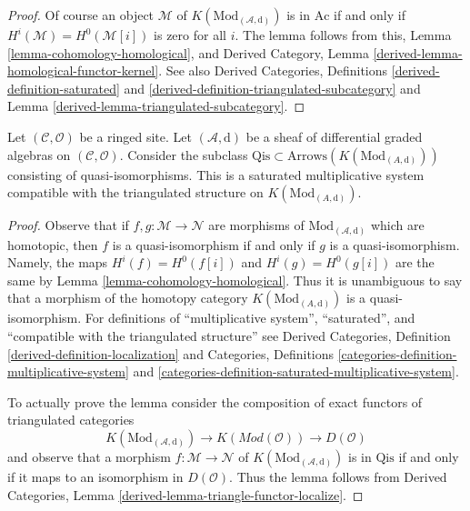 \begin{proof}
Of course an object $\mathcal{M}$ of $K(\text{Mod}_{(\mathcal{A}, \text{d})})$
is in $\text{Ac}$ if and only if $H^i(\mathcal{M}) = H^0(\mathcal{M}[i])$
is zero for all $i$. The lemma follows from this,
Lemma \ref{lemma-cohomology-homological}, and
Derived Category, Lemma \ref{derived-lemma-homological-functor-kernel}.
See also Derived Categories, Definitions \ref{derived-definition-saturated}
and \ref{derived-definition-triangulated-subcategory} and
Lemma \ref{derived-lemma-triangulated-subcategory}.
\end{proof}

\begin{lemma}
\label{lemma-qis}
Let $(\mathcal{C}, \mathcal{O})$ be a ringed site. Let
$(\mathcal{A}, \text{d})$ be a sheaf of differential graded algebras
on $(\mathcal{C}, \mathcal{O})$.
Consider the subclass
$\text{Qis} \subset \text{Arrows}(K(\text{Mod}_{(A, \text{d})}))$
consisting of quasi-isomorphisms. This is a saturated multiplicative
system compatible with the triangulated structure on
$K(\text{Mod}_{(A, \text{d})})$.
\end{lemma}

\begin{proof}
Observe that if $f , g : \mathcal{M} \to \mathcal{N}$ are morphisms
of $\text{Mod}_{(\mathcal{A}, \text{d})}$ which are homotopic,
then $f$ is a quasi-isomorphism if and only if $g$ is a quasi-isomorphism.
Namely, the maps $H^i(f) = H^0(f[i])$ and $H^i(g) = H^0(g[i])$ are
the same by Lemma \ref{lemma-cohomology-homological}. Thus it is
unambiguous to say that a morphism of the homotopy category
$K(\text{Mod}_{(A, \text{d})})$ is a quasi-isomorphism.
For definitions of ``multiplicative system'', ``saturated'', and
``compatible with the triangulated structure'' see
Derived Categories, Definition \ref{derived-definition-localization}
and
Categories, Definitions \ref{categories-definition-multiplicative-system}
and \ref{categories-definition-saturated-multiplicative-system}.

\medskip\noindent
To actually prove the lemma consider the composition
of exact functors of triangulated categories
$$
K(\text{Mod}_{(\mathcal{A}, \text{d})})
\longrightarrow
K(\textit{Mod}(\mathcal{O}))
\longrightarrow
D(\mathcal{O})
$$
and observe that a morphism $f : \mathcal{M} \to \mathcal{N}$
of $K(\text{Mod}_{(\mathcal{A}, \text{d})})$ is in $\text{Qis}$
if and only if it maps to an isomorphism in $D(\mathcal{O})$.
Thus the lemma follows from Derived Categories, Lemma
\ref{derived-lemma-triangle-functor-localize}.
\end{proof}

